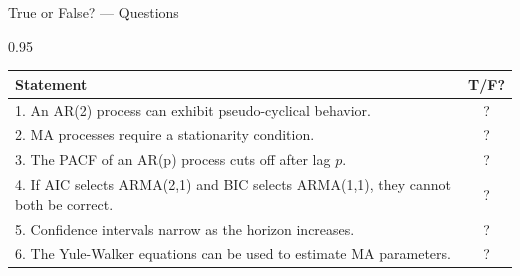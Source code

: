 \documentclass[9pt, aspectratio=169, t]{beamer}
\begin{document}
\begin{frame}{True or False? --- Questions}
    \begin{cminipage}{0.95\textwidth}
    \footnotesize
    \begin{center}
    \begin{tabular}{p{9cm}c}
        \toprule
        \textbf{Statement} & \textbf{T/F?} \\
        \midrule
        1. An AR(2) process can exhibit pseudo-cyclical behavior. & ? \\[0.15cm]
        2. MA processes require a stationarity condition. & ? \\[0.15cm]
        3. The PACF of an AR(p) process cuts off after lag $p$. & ? \\[0.15cm]
        4. If AIC selects ARMA(2,1) and BIC selects ARMA(1,1), they cannot both be correct. & ? \\[0.15cm]
        5. Confidence intervals narrow as the horizon increases. & ? \\[0.15cm]
        6. The Yule-Walker equations can be used to estimate MA parameters. & ? \\
        \bottomrule
    \end{tabular}
    \end{center}
    \end{cminipage}
\end{frame}
\end{document}
